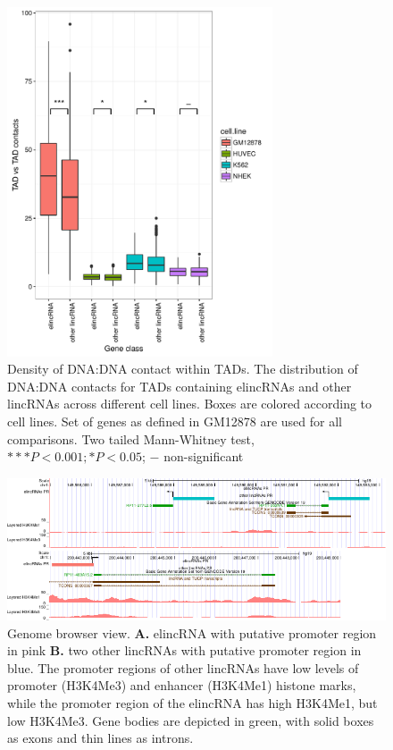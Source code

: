\documentclass[11pt,a4paper]{report}
\begin{document}
\begin{figure}[ht]
	\includegraphics[width=0.7\textwidth]{Figures/6_TAD_TAD_contact.pdf}
	\caption{Density of DNA:DNA contact within TADs. The distribution of DNA:DNA contacts for TADs containing elincRNAs and other lincRNAs across different cell lines. Boxes are colored according to cell lines. Set of genes as defined in GM12878 are used for all comparisons. Two tailed Mann-Whitney test, $***P<0.001; *P<0.05$; $-$ non-significant}
	\label{TAD_TAD_contacts}
\end{figure}

\begin{figure}[ht]
	\includegraphics[width=1\textwidth]{Figures/7_merged_examples.pdf}
	\caption{Genome browser view. \textbf{A.} elincRNA with putative promoter region in pink \textbf{B.} two other lincRNAs with putative promoter region in blue. The promoter regions of other lincRNAs have low levels of promoter (H3K4Me3) and enhancer (H3K4Me1) histone marks, while the promoter region of the elincRNA has high H3K4Me1, but low H3K4Me3. Gene bodies are depicted in green, with solid boxes as exons and thin lines as introns.}
	\label{Genome_browser}
\end{figure}
\FloatBarrier
\end{document}
